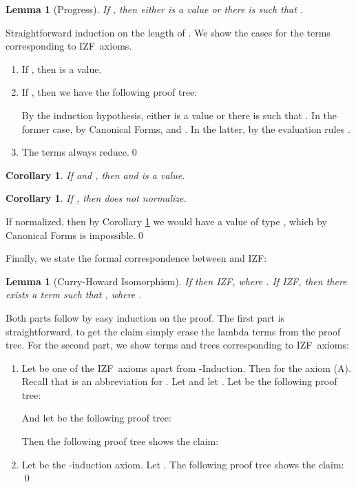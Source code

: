 \documentclass{LMCS}
\newtheorem{corollary}[thm]{Corollary}
\newtheorem{lemma}[thm]{Lemma}
\newcommand{\izfr}{IZF}
\newcommand{\iizfr}{IZF}
\begin{document}
\begin{lemma}[Progress]
If , then either  is a value or there is  such that .
\end{lemma}
\proof Straightforward induction on the length of . We show the cases for the
terms corresponding to \izfr\ axioms.
\begin{enumerate}[]
\item If , then  is a value.
\item If , then we have the following proof tree:

By the induction hypothesis, either  is a value or there is  such
that . In the former case, by Canonical Forms,  and . In the latter, by the evaluation rules .
\item The  terms always reduce.\qed
\end{enumerate}

\begin{corollary}\label{corlz}
If  and , then  and  is a value.
\end{corollary}

\begin{corollary}\label{corbot}
If , then  does not normalize.
\end{corollary}
\proof If  normalized, then by Corollary \ref{corlz} we would have a value of
type , which by Canonical Forms is impossible.\qed


Finally, we state the formal correspondence between  and \iizfr:

\begin{lemma}[Curry-Howard Isomorphism]\label{ch}
If  then \iizfr , where . If \iizfr , then there exists a term  such that , where .
\end{lemma}
\proof Both parts follow by easy induction on the proof. The first part is
straightforward, to get the claim simply erase the lambda terms from the
proof tree. For the second part, we show terms and trees corresponding to \iizfr\ axioms:
\begin{enumerate}[]
\item Let  be one of the \iizfr\ axioms apart from -Induction.
Then  for the axiom (A). Recall that  is an
abbreviation for . Let 
and let . 
Let  be the following proof tree:

And let  be the following proof tree:

Then the following proof tree shows the claim:

\item Let  be the -induction axiom. Let .
The following proof tree shows the claim:
\qed
\end{enumerate}
\end{document}
